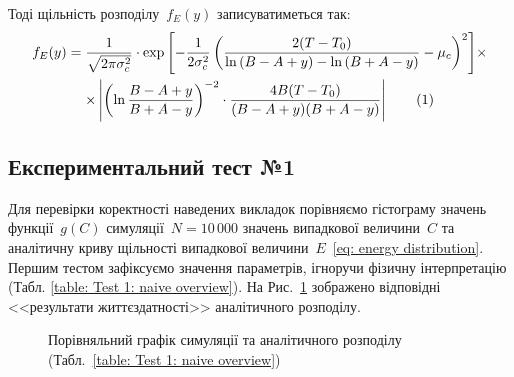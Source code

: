 \documentclass{mathreport}
\begin{document}
Тоді щільність розподілу~$f_E(y)$ записуватиметься так:
\begin{multline*}\label{eq: energy distribution}
    f_E(y) = \frac{1}{\sqrt{2\pi \sigma_c^2}} \cdot \exp{\left[ -\frac{1}{2\sigma_c^2} \left( \frac{2(T-T_0)}{\ln{(B-A+y)} - \ln{(B+A-y)}} - \mu_c \right)^2 \right]} \times \\ 
    \times \left| \left( \ln{\frac{B-A+y}{B+A-y}} \right)^{-2} \cdot \frac{4B(T-T_0)}{(B-A+y)(B+A-y)} \right| \stepcounter{equation}\tag{\theequation}
\end{multline*}

\subsection*{Експериментальний тест №1}

Для перевірки коректності наведених викладок порівняємо гістограму значень функції~$g(C)$ симуляції~$N=10\,000$ значень випадкової величини~$C$ та аналітичну криву щільності випадкової величини~$E$~\eqref{eq: energy distribution}. Першим тестом зафіксуємо значення параметрів, ігноручи фізичну інтерпретацію (Табл. \ref{table: Test 1: naive overview}). На Рис.~\ref{pic: Test 1: naive overview} зображено відповідні <<результати життєздатності>> аналітичного розподілу.

\vspace{0.4cm}
\begin{figure}[H]\centering
    \caption{Порівняльний графік симуляції та аналітичного розподілу (Табл.~\ref{table: Test 1: naive overview})}
    \label{pic: Test 1: naive overview}
\end{figure}
\end{document}
